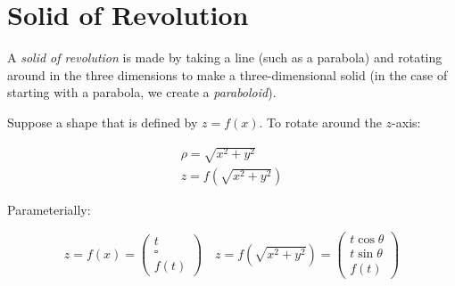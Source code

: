 \documentclass[00_complete]{subfiles}
\begin{document}
\section{Solid of Revolution}

A \emph{solid of revolution} is made by taking a line (such as a parabola) and rotating
around in the three dimensions to make a three-dimensional solid (in the case of
starting with a parabola, we create a \emph{paraboloid}).

Suppose a shape that is defined by $z=f(x)$. To rotate around the $z$-axis:

$$
\begin{gathered}
    \rho=\sqrt{x^2+y^2} \\
    z=f\left(\sqrt{x^2+y^2}\right)
\end{gathered}
$$

Parameterially:

$$z=f(x) = \begin{pmatrix}
    t \\ \square \\ f(t)
\end{pmatrix}
\quad
z=f\left(\sqrt{x^2+y^2}\right) = \begin{pmatrix}
    t \cos \theta \\ t \sin \theta \\ f(t)
\end{pmatrix}$$
\end{document}
